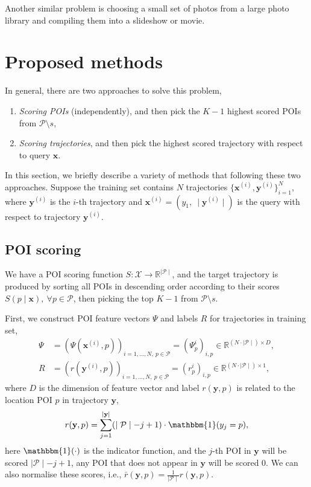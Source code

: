 \documentclass[9pt]{extarticle}
\begin{document}
Another similar problem is choosing a small set of photos from a large photo library and compiling them into a slideshow or movie.



\section{Proposed methods}
\label{sec:methods}

In general, there are two approaches to solve this problem,
\begin{enumerate}
\item \emph{Scoring POIs} (independently), and then pick the $K-1$ highest scored POIs from $\mathcal{P} \setminus s$,
\item \emph{Scoring trajectories}, and then pick the highest scored trajectory with respect to query $\mathbf{x}$.
\end{enumerate}

In this section, we briefly describe a variety of methods that following these two approaches.
Suppose the training set contains $N$ trajectories 
$\{ \mathbf{x}^{(i)}, \mathbf{y}^{(i)} \}_{i=1}^N$,
where $\mathbf{y}^{(i)}$ is the $i$-th trajectory and $\mathbf{x}^{(i)} = (y_1,~ \mid \mathbf{y}^{(i)} \mid)$ is the query 
with respect to trajectory $\mathbf{y}^{(i)}$.



\subsection{POI scoring}
\label{sec:scoring_point}

We have a POI scoring function $S: \mathcal{X} \to \mathbb{R}^{\mid \mathcal{P} \mid}$, 
and the target trajectory is produced by sorting all POIs in descending order according to their scores 
$S(p \mid \mathbf{x}),~ \forall p \in \mathcal{P}$,
then picking the top $K-1$ from $\mathcal{P} \setminus s$.

First, we construct POI feature vectors $\Psi$ and labels $R$ for trajectories in training set, 
\begin{align*}
\Psi &= \left( \Psi(\mathbf{x}^{(i)}, p) \right)_{i=1,\dots,N,~p \in \mathcal{P}} = \left( \Psi_p^i \right)_{i,p}
        \in \mathbb{R}^{(N \cdot \mid \mathcal{P} \mid) \times D}, \\
   R &= \left( r(\mathbf{y}^{(i)}, p) \right)_{i=1,\dots,N,~p \in \mathcal{P}} = \left(r_p^i \right)_{i,p}
        \in \mathbb{R}^{(N \cdot \mid \mathcal{P} \mid) \times 1},
\end{align*}
where $D$ is the dimension of feature vector and label $r(\mathbf{y}, p)$ is related to the location POI $p$ in trajectory $\mathbf{y}$,
\begin{equation*}
r(\mathbf{y}, p) = \sum_{j=1}^{\mid \mathbf{y} \mid} (\mid \mathcal{P} \mid - j + 1) \cdot \mathbbm{1}(y_j = p),
\end{equation*}
here $\mathbbm{1}(\cdot)$ is the indicator function, and the $j$-th POI in $\mathbf{y}$ will be scored $\mid \mathcal{P} \mid - j + 1$, 
any POI that does not appear in $\mathbf{y}$ will be scored $0$.
We can also normalise these scores, i.e., $\bar{r}(\mathbf{y}, p) = \frac{1}{\mid \mathcal{P} \mid} r(\mathbf{y}, p)$.
\end{document}
